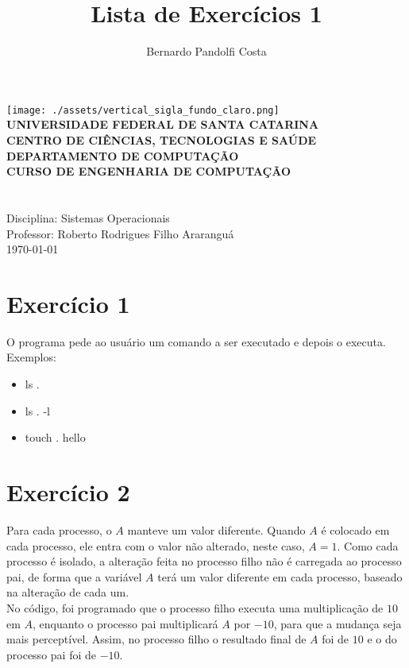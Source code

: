 \documentclass[a4paper,12pt]{article}
\author{Bernardo Pandolfi Costa}
\title{Lista de Exercícios 1}
\begin{document}
\makeatletter
\begin{titlepage}
    \begin{center}
    \texttt{[image: ./assets/vertical\_sigla\_fundo\_claro.png]}\\
        \small
        \vspace{0.25cm}
        \textbf{UNIVERSIDADE FEDERAL DE SANTA CATARINA}\\
		\textbf{CENTRO DE CIÊNCIAS, TECNOLOGIAS E SAÚDE}\\
		\textbf{DEPARTAMENTO DE COMPUTAÇÃO}\\
		\textbf{CURSO DE ENGENHARIA DE COMPUTAÇÃO}\\
        \vspace{7cm}
        \Large
        \textbf{\@title}\\
        \vspace{0.5cm}
        \normalsize
        \textbf{\@author}\\
        \vspace{1.5cm}
        \small
        Disciplina: Sistemas Operacionais\\
        Professor: Roberto Rodrigues Filho
        \vfill
        Araranguá\\
        \today
    \end{center}
\end{titlepage}
\makeatother

\tableofcontents
\newpage

\section{Exercício 1}
O programa pede ao usuário um comando a ser executado e depois o executa.\\
Exemplos: 
\begin{itemize}
\item ls .
\item ls . -l
\item touch . hello
\end{itemize}

\section{Exercício 2}
Para cada processo, o $A$ manteve um valor diferente. Quando $A$ é colocado em cada processo, ele entra com o valor não alterado, neste caso, $A = 1$. Como cada processo é isolado, a alteração feita no processo filho não é carregada ao processo pai, de forma que a variável $A$ terá um valor diferente em cada processo, baseado na alteração de cada um.\\
No código, foi programado que o processo filho executa uma multiplicação de $10$ em $A$, enquanto o processo pai multiplicará $A$ por $-10$, para que a mudança seja mais perceptível. Assim, no processo filho o resultado final de $A$ foi de $10$ e o do processo pai foi de $-10$.
\end{document}
